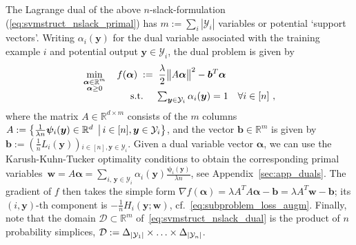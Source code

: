\documentclass[twoside,11pt]{article}
\newcommand{\vectornorm}[1]{\left|\left|#1\right|\right|}
\newcommand{\comment}[1]{}
\newcommand{\simplex}{\Delta}
\newcommand{\R}{\mathbb{R}}
\newcommand\SetOf[2]{\left\{#1\,\vphantom{#2}\right.\left|\vphantom{#1}\,#2\right\}}
\newcommand{\0}{\mathbf{0}} %
\newcommand{\bv}{\bm{b}}
\newcommand{\outputvar}{y}
\newcommand{\outputvarv}{\bm{\outputvar}}
\newcommand{\outputdomain}{\mathcal{Y}}
\newcommand{\featuremapdiff}{\psi}
\newcommand{\featuremapdiffv}{\bm{\featuremapdiff}}
\newcommand{\errorterm}{L}
\newcommand{\weight}{w}
\newcommand{\wv}{{\bm{\weight}}}
\newcommand{\dualvar}{\alpha}
\newcommand{\dualvarv}{\bm{\alpha}}
\newcommand{\domain}{\mathcal{D}} %
\begin{document}
The Lagrange dual of the above $n$-slack-formulation (\ref{eq:svmstruct_nslack_primal}) has $m := \sum_i |\outputdomain_i|$ variables or potential `support vectors'.
Writing $\dualvar_i(\outputvarv)$ for the dual variable associated with the training example $i$ and potential output $\outputvarv \in \outputdomain_i$, the dual problem is given by
\begin{align}
    \label{eq:svmstruct_nslack_dual} %
    \min_{\substack{ \dualvarv\in\R^{m} \\  \dualvarv \geq 0}} \quad  f(\dualvarv) \;:=&  \;\;
    \frac{\lambda}{2}
    \big\| A\dualvarv \big\|^2
    - \bv^T\dualvarv
    \\[-2mm]
    \text{s.t.} \quad &  \;
      \textstyle\sum_{\outputvarv \in \outputdomain_i}  \dualvar_i(\outputvarv) = 1 ~~~\forall i\in[n] \ , \notag 
\end{align}
where the matrix $A\in\R^{d\times m}$ consists of the $m$ columns $A := \SetOf{\frac1{\lambda n} \featuremapdiffv_i(\outputvarv) \in\R^d}{i\in[n],\outputvarv \in \outputdomain_i}$, and the vector $\bv \in \R^m$ is given by 
$\bv:= \left(\frac1n \errorterm_i(\outputvarv) \right)$$_{i\in[n],\outputvarv\in\outputdomain_i}$. %
Given a dual variable vector $\dualvarv$, we can use the Karush-Kuhn-Tucker optimality conditions  to obtain the corresponding primal variables~$
\wv = A\dualvarv  = \sum_{i,\,\outputvarv \in \outputdomain_i} \dualvar_i(\outputvarv)  \frac{\featuremapdiffv_i(\outputvarv)}{\lambda n}
$, see Appendix~\ref{sec:app_duals}.
The gradient of $f$ then takes the simple form $\nabla f(\dualvarv) = \lambda A^TA\dualvarv - \bv = \lambda A^T\wv - \bv$; its \mbox{$(i,\outputvarv)$-th} component is $-\frac{1}{n} H_i(\outputvarv; \wv)$, cf.~\eqref{eq:subproblem_loss_augm}. 
Finally, note that the domain $\domain \subset \R^m$ of~\eqref{eq:svmstruct_nslack_dual} is the product of $n$ probability simplices, $\domain := \simplex_{|\outputdomain_1|}\times\mathellipsis\times\simplex_{|\outputdomain_n|}$.


\comment{
Not sure we need this:
This is usually formulated as a quadratic program (QP) with
soft margin constraints~\cite{Tsochantaridis04}:
%
\begin{eqnarray}
\label{eq:ssvm_primal}
& & \min_{\wv,\bm{\xi}\geq\mathbf{0}} \frac{\lambda}{2} \vectornorm{\wv}^2 + 
	\sum_{n=1}^N \xi_n 
\\
\nonumber
& & \mbox{s.t. } \forall \; n: S_\mathbf{w}(Y^n) \geq  \max_{Y \in \mathcal{Y}_n}(S_\mathbf{w}(Y) + \Delta(Y^n,Y)) - \xi_n,
\end{eqnarray}
%
where $\mathcal{Y}_n$ is the set of all possible labelings for example
$n$, the constant $\lambda$ controls the trade-off between margin and
training error, and the \emph{task loss} $\Delta$ measures the closeness of any inferred labeling $Y$ to the ground truth labeling $Y^n$.
}
\end{document}
